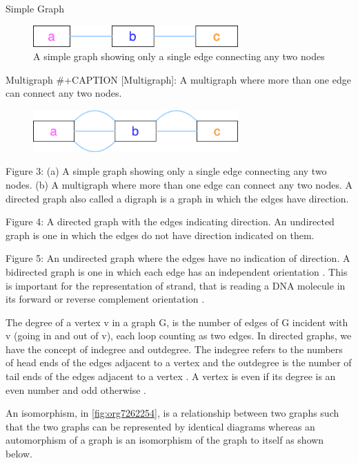 \documentclass[10pt, a4paper]{article}
\begin{document}
Simple Graph
\begin{figure}
\centering
\includegraphics[width=0.7\textwidth]{figures/Graph-classifications-Simple-Graph.png}
\caption[Simple Graph]{\label{fig:org0ff289e}
A simple graph showing only a single edge connecting any two nodes}
\end{figure}


Multigraph
\#+CAPTION [Multigraph]: A multigraph where more than one edge can connect any two nodes.
\begin{figure}
\centering
\includegraphics[width=0.7\textwidth]{figures/Graph-classifications-Multigraph.png}
\label{org69374cc}
\end{figure}


Figure 3: (a) A simple graph showing only a single edge connecting any two
nodes. (b) A multigraph where more than one edge can connect any two nodes.
A directed graph also called a digraph is a graph in which the edges have
direction.

Figure 4: A directed graph with the edges indicating direction.
An undirected graph is one in which the edges do not have direction indicated on
them.

Figure 5: An undirected graph where the edges have no indication of direction.
A bidirected graph is one in which each edge has an independent orientation
\cite{edmondsMatchingWellSolvedClass2003}.
This is important for the representation of strand, that is reading a DNA
molecule in its forward or reverse complement orientation 
\cite{patenGenomeGraphsEvolution2017}.

The degree of a vertex v in a graph G, is the number of edges of G incident with
v (going in and out of v), each loop counting as two edges. In directed graphs,
we have the concept of indegree and outdegree. The indegree refers to the
numbers of head ends of the edges adjacent to a vertex and the outdegree is the
number of tail ends of the edges adjacent to a vertex \cite{bondyGraphTheory2011}.
A vertex is even if its degree is an even number and odd otherwise
\cite{trudeauIntroductionGraphTheory1993}.

An isomorphism, in \ref{fig:org7262254}, is a relationship between two graphs such that the two graphs
can be represented by identical diagrams \cite{bondyGraphTheory2011} whereas an 
automorphism of a graph is an isomorphism of the graph to itself as shown below.
\end{document}
